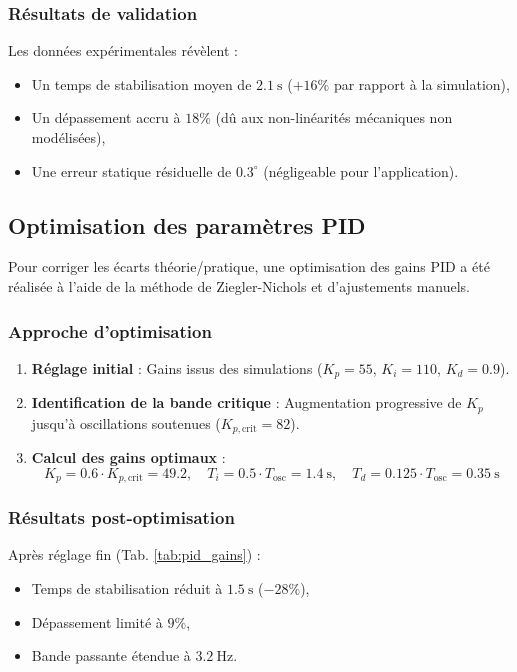 \documentclass{report}
\begin{document}
\subsubsection{Résultats de validation}
Les données expérimentales révèlent :
\begin{itemize}
    \item Un temps de stabilisation moyen de $2.1\ \text{s}$ ($+16\%$ par rapport à la simulation),
    \item Un dépassement accru à $18\%$ (dû aux non-linéarités mécaniques non modélisées),
    \item Une erreur statique résiduelle de $0.3^\circ$ (négligeable pour l'application).
\end{itemize}

\subsection{Optimisation des paramètres PID}
\label{subsec:optim_pid}

Pour corriger les écarts théorie/pratique, une optimisation des gains PID a été réalisée à l'aide de la méthode de Ziegler-Nichols et d'ajustements manuels.

\subsubsection{Approche d'optimisation}
\begin{enumerate}
    \item \textbf{Réglage initial} : Gains issus des simulations ($K_p=55$, $K_i=110$, $K_d=0.9$).
    \item \textbf{Identification de la bande critique} : Augmentation progressive de $K_p$ jusqu'à oscillations soutenues ($K_{p,\text{crit}}=82$).
    \item \textbf{Calcul des gains optimaux} : 
        \begin{equation}
            K_p = 0.6 \cdot K_{p,\text{crit}} = 49.2, \quad
            T_i = 0.5 \cdot T_{\text{osc}} = 1.4\ \text{s}, \quad
            T_d = 0.125 \cdot T_{\text{osc}} = 0.35\ \text{s}
        \end{equation}
\end{enumerate}

\subsubsection{Résultats post-optimisation}
Après réglage fin (Tab. \ref{tab:pid_gains}) :
\begin{itemize}
    \item Temps de stabilisation réduit à $1.5\ \text{s}$ ($-28\%$),
    \item Dépassement limité à $9\%$,
    \item Bande passante étendue à $3.2\ \text{Hz}$.
\end{itemize}
\end{document}
